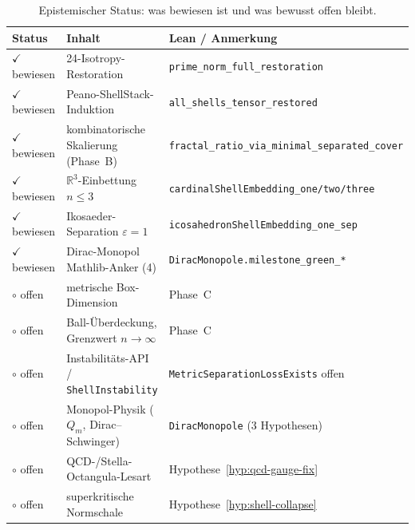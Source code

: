 \documentclass[11pt,a4paper]{article}
\begin{document}
	\begin{table}[h!]
		\centering
		\small
		\begin{tabular}{lll}
			\hline
			\textbf{Status} & \textbf{Inhalt} & \textbf{Lean / Anmerkung} \\
			\hline
			$\checkmark$ bewiesen & 24-Isotropy-Restoration & \texttt{prime\_norm\_full\_restoration} \\
			$\checkmark$ bewiesen & Peano-ShellStack-Induktion & \texttt{all\_shells\_tensor\_restored} \\
			$\checkmark$ bewiesen & kombinatorische Skalierung (Phase~B) &
			\texttt{fractal\_ratio\_via\_minimal\_separated\_cover} \\
			$\checkmark$ bewiesen & $\mathbb{R}^3$-Einbettung $n\le 3$ &
			\texttt{cardinalShellEmbedding\_one/two/three} \\
			$\checkmark$ bewiesen & Ikosaeder-Separation $\varepsilon=1$ &
			\texttt{icosahedronShellEmbedding\_one\_sep} \\
			$\checkmark$ bewiesen & Dirac-Monopol Mathlib-Anker (4) &
			\texttt{DiracMonopole.milestone\_green\_*} \\
			$\circ$ offen & metrische Box-Dimension & Phase~C \\
			$\circ$ offen & Ball-Überdeckung, Grenzwert $n\to\infty$ & Phase~C \\
			$\circ$ offen & Instabilitäts-API / \texttt{ShellInstability} &
			\texttt{MetricSeparationLossExists} offen \\
			$\circ$ offen & Monopol-Physik ($Q_m$, Dirac--Schwinger) &
			\texttt{DiracMonopole} (3 Hypothesen) \\
			$\circ$ offen & QCD-/Stella-Octangula-Lesart & Hypothese~\ref{hyp:qcd-gauge-fix} \\
			$\circ$ offen & superkritische Normschale & Hypothese~\ref{hyp:shell-collapse} \\
			\hline
		\end{tabular}
		\caption{Epistemischer Status: was bewiesen ist und was bewusst offen bleibt.}
		\label{tab:epistemic-status}
	\end{table}
	
\end{document}
